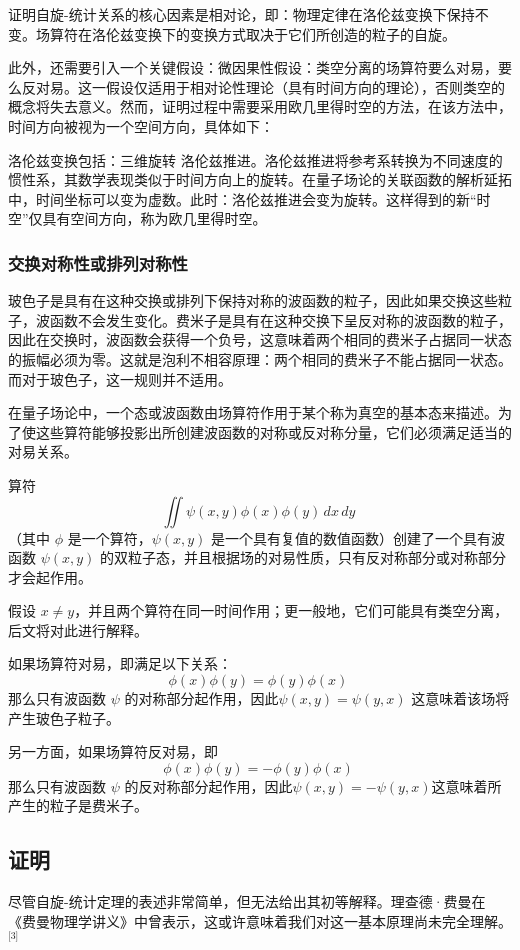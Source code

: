 证明自旋-统计关系的核心因素是相对论，即：物理定律在洛伦兹变换下保持不变。场算符在洛伦兹变换下的变换方式取决于它们所创造的粒子的自旋。  

此外，还需要引入一个关键假设：微因果性假设：类空分离的场算符要么对易，要么反对易。这一假设仅适用于相对论性理论（具有时间方向的理论），否则类空的概念将失去意义。然而，证明过程中需要采用欧几里得时空的方法，在该方法中，时间方向被视为一个空间方向，具体如下：  

洛伦兹变换包括：三维旋转 洛伦兹推进。洛伦兹推进将参考系转换为不同速度的惯性系，其数学表现类似于时间方向上的旋转。在量子场论的关联函数的解析延拓中，时间坐标可以变为虚数。此时：洛伦兹推进会变为旋转。这样得到的新“时空”仅具有空间方向，称为欧几里得时空。
\subsubsection{交换对称性或排列对称性}  
玻色子是具有在这种交换或排列下保持对称的波函数的粒子，因此如果交换这些粒子，波函数不会发生变化。费米子是具有在这种交换下呈反对称的波函数的粒子，因此在交换时，波函数会获得一个负号，这意味着两个相同的费米子占据同一状态的振幅必须为零。这就是泡利不相容原理：两个相同的费米子不能占据同一状态。而对于玻色子，这一规则并不适用。

在量子场论中，一个态或波函数由场算符作用于某个称为真空的基本态来描述。为了使这些算符能够投影出所创建波函数的对称或反对称分量，它们必须满足适当的对易关系。  

算符  
\[
\iint \psi (x,y)\phi (x)\phi (y)\,dx\,dy~
\]
（其中 \(\phi\) 是一个算符，\(\psi (x,y)\) 是一个具有复值的数值函数）创建了一个具有波函数 \(\psi (x,y)\) 的双粒子态，并且根据场的对易性质，只有反对称部分或对称部分才会起作用。

假设 \( x \neq y \)，并且两个算符在同一时间作用；更一般地，它们可能具有类空分离，后文将对此进行解释。  

如果场算符对易，即满足以下关系：  
\[
\phi (x)\phi (y) = \phi (y)\phi (x)~
\]
那么只有波函数 \( \psi \) 的对称部分起作用，因此\(\psi (x,y) = \psi (y,x)\)
这意味着该场将产生玻色子粒子。  

另一方面，如果场算符反对易，即  
\[
\phi (x)\phi (y) = -\phi (y)\phi (x)~
\]
那么只有波函数 \( \psi \) 的反对称部分起作用，因此\(\psi (x,y) = -\psi (y,x)
\)这意味着所产生的粒子是费米子。
\subsection{证明} 
尽管自旋-统计定理的表述非常简单，但无法给出其初等解释。理查德·费曼在《费曼物理学讲义》中曾表示，这或许意味着我们对这一基本原理尚未完全理解。\(^\text{[3]}\) 

